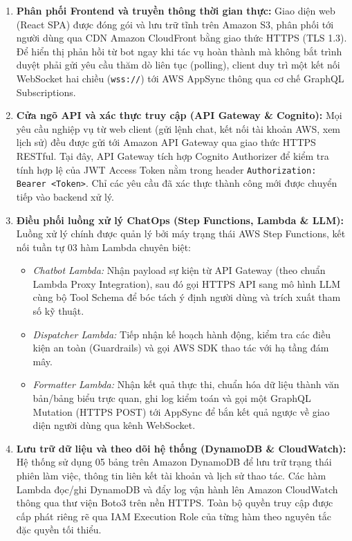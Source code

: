 \documentclass[a4paper,12pt]{article}
\begin{document}
\begin{enumerate}[itemsep=4pt,topsep=2pt]
  \item \textbf{Phân phối Frontend và truyền thông thời gian thực:} 
  Giao diện web (React SPA) được đóng gói và lưu trữ tĩnh trên Amazon S3, phân phối tới người dùng qua CDN Amazon CloudFront bằng giao thức HTTPS (TLS 1.3). Để hiển thị phản hồi từ bot ngay khi tác vụ hoàn thành mà không bắt trình duyệt phải gửi yêu cầu thăm dò liên tục (polling), client duy trì một kết nối WebSocket hai chiều (\texttt{wss://}) tới AWS AppSync thông qua cơ chế GraphQL Subscriptions.

  \item \textbf{Cửa ngõ API và xác thực truy cập (API Gateway \& Cognito):} 
  Mọi yêu cầu nghiệp vụ từ web client (gửi lệnh chat, kết nối tài khoản AWS, xem lịch sử) đều được gửi tới Amazon API Gateway qua giao thức HTTPS RESTful. Tại đây, API Gateway tích hợp Cognito Authorizer để kiểm tra tính hợp lệ của JWT Access Token nằm trong header \texttt{Authorization: Bearer <Token>}. Chỉ các yêu cầu đã xác thực thành công mới được chuyển tiếp vào backend xử lý.

  \item \textbf{Điều phối luồng xử lý ChatOps (Step Functions, Lambda \& LLM):} 
  Luồng xử lý chính được quản lý bởi máy trạng thái AWS Step Functions, kết nối tuần tự 03 hàm Lambda chuyên biệt:
  \begin{itemize}
    \item \textit{Chatbot Lambda:} Nhận payload sự kiện từ API Gateway (theo chuẩn Lambda Proxy Integration), sau đó gọi HTTPS API sang mô hình LLM cùng bộ Tool Schema để bóc tách ý định người dùng và trích xuất tham số kỹ thuật.
    \item \textit{Dispatcher Lambda:} Tiếp nhận kế hoạch hành động, kiểm tra các điều kiện an toàn (Guardrails) và gọi AWS SDK thao tác với hạ tầng đám mây.
    \item \textit{Formatter Lambda:} Nhận kết quả thực thi, chuẩn hóa dữ liệu thành văn bản/bảng biểu trực quan, ghi log kiểm toán và gọi một GraphQL Mutation (HTTPS POST) tới AppSync để bắn kết quả ngược về giao diện người dùng qua kênh WebSocket.
  \end{itemize}

  \item \textbf{Lưu trữ dữ liệu và theo dõi hệ thống (DynamoDB \& CloudWatch):} 
  Hệ thống sử dụng 05 bảng trên Amazon DynamoDB để lưu trữ trạng thái phiên làm việc, thông tin liên kết tài khoản và lịch sử thao tác. Các hàm Lambda đọc/ghi DynamoDB và đẩy log vận hành lên Amazon CloudWatch thông qua thư viện Boto3 trên nền HTTPS. Toàn bộ quyền truy cập được cấp phát riêng rẽ qua IAM Execution Role của từng hàm theo nguyên tắc đặc quyền tối thiểu.


\end{enumerate}
\end{document}
